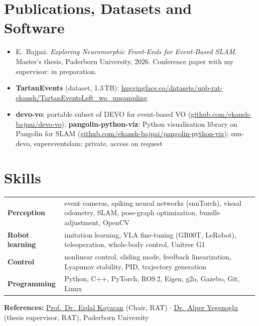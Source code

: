 \documentclass[10pt,a4paper]{article}
\newcommand{\link}[2]{\href{#1}{\color{accent}#2}}
\begin{document}
\section{Publications, Datasets and Software}
\begin{itemize}
\item E.\ Bajpai. \emph{Exploring Neuromorphic Front-Ends for Event-Based SLAM}. Master's thesis, Paderborn University, 2026.
      Conference paper with my supervisor: in preparation.
\item \textbf{TartanEvents} (dataset, 1.3\,TB): \link{https://huggingface.co/datasets/upb-rat-ekansh/TartanEventsLeft_wo_upsampling}{huggingface.co/datasets/upb-rat-ekansh/TartanEventsLeft\_wo\_upsampling}
\item \textbf{devo-vo}: portable subset of DEVO for event-based VO (\link{https://github.com/ekansh-bajpai/devo-vo}{github.com/ekansh-bajpai/devo-vo});
      \textbf{pangolin-python-viz}: Python visualisation library on Pangolin for SLAM
      (\link{https://github.com/ekansh-bajpai/pangolin-python-viz}{github.com/ekansh-bajpai/pangolin-python-viz});
      snn-devo, supereventslam: private, access on request
\end{itemize}

\section{Skills}
\begin{tabularx}{\linewidth}{@{}l X@{}}
\textbf{Perception} & event cameras, spiking neural networks (snnTorch), visual odometry, SLAM, pose-graph optimization, bundle adjustment, OpenCV \\
\textbf{Robot learning} & imitation learning, VLA fine-tuning (GR00T, LeRobot), teleoperation, whole-body control, Unitree G1 \\
\textbf{Control} & nonlinear control, sliding mode, feedback linearization, Lyapunov stability, PID, trajectory generation \\
\textbf{Programming} & Python, C++, PyTorch, ROS\,2, Eigen, g2o, Gazebo, Git, Linux \\
\end{tabularx}

{\small\color{accent}\textbf{References:}} {\small \link{mailto:erdal.kayacan@uni-paderborn.de}{Prof.\ Dr.\ Erdal Kayacan} (Chair, RAT) $\cdot$
\link{mailto:alper.yegenoglu@uni-paderborn.de}{Dr.\ Alper Yegenoglu} (thesis supervisor, RAT), Paderborn University}
\end{document}
